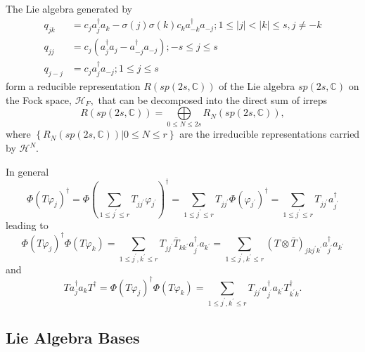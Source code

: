 \documentclass[aps,preprint]{revtex4}%
\begin{document}
The Lie algebra generated by
\begin{align}
q_{jk}  &  =c_{j}a_{j}^{\dagger}a_{k}-\sigma\left(  j\right)  \sigma\left(
k\right)  c_{k}a_{-k}^{\dagger}a_{-j};1\leq\left\vert j\right\vert <\left\vert
k\right\vert \leq s,j\neq-k\\
q_{jj}  &  =c_{j}\left(  a_{j}^{\dagger}a_{j}-a_{-j}^{\dagger}a_{-j}\right)
;-s\leq j\leq s\\
q_{j-j}  &  =c_{j}a_{j}^{\dagger}a_{-j};1\leq j\leq s
\end{align}
form a reducible representation $R\left(  sp\left(  2s,\mathbb{C}\right)
\right)  $ of the Lie algebra $sp\left(  2s,\mathbb{C}\right)  $ on the Fock
space, $\mathcal{H}_{F},$ that can be decomposed into the direct sum of
irreps
\begin{equation}
R\left(  sp\left(  2s,\mathbb{C}\right)  \right)  =\bigoplus\limits_{0\leq
N\leq2s}R_{N}\left(  sp\left(  2s,\mathbb{C}\right)  \right)  ,
\end{equation}
where $\left\{  \left.  R_{N}\left(  sp\left(  2s,\mathbb{C}\right)  \right)
\right\vert 0\leq N\leq r\right\}  $ are the irreducible representations
carried by $\mathcal{H}^{N}.$

In general%
\begin{equation}
\Phi\left(  T\varphi_{j}\right)  ^{\dagger}=\Phi\left(  \sum_{1\leq j^{\prime
}\leq r}T_{jj^{\prime}}\varphi_{j^{\prime}}\right)  ^{\dagger}=\sum_{1\leq
j^{\prime}\leq r}T_{jj^{\prime}}\Phi\left(  \varphi_{j^{\prime}}\right)
^{\dagger}=\sum_{1\leq j^{\prime}\leq r}T_{jj^{\prime}}a_{j^{\prime}}%
^{\dagger}%
\end{equation}
leading to
\begin{equation}
\Phi\left(  T\varphi_{j}\right)  ^{\dagger}\Phi\left(  T\varphi_{k}\right)
=\sum_{1\leq j^{\prime},k^{\prime}\leq r}T_{jj^{\prime}}\bar{T}_{kk^{\prime}%
}a_{j^{\prime}}^{\dagger}a_{k^{\prime}}=\sum_{1\leq j^{\prime},k^{\prime}\leq
r}\left(  T\otimes\bar{T}\right)  _{jkj^{\prime}k^{\prime}}a_{j^{\prime}%
}^{\dagger}a_{k^{\prime}}%
\end{equation}
and%
\begin{equation}
Ta_{j}^{\dagger}a_{k}T^{\dagger}=\Phi\left(  T\varphi_{j}\right)  ^{\dagger
}\Phi\left(  T\varphi_{k}\right)  =\sum_{1\leq j^{\prime},k^{\prime}\leq
r}T_{jj^{\prime}}a_{j^{\prime}}^{\dagger}a_{k^{\prime}}T_{k^{\prime}%
k}^{\dagger}.
\end{equation}


\subsection{Lie Algebra Bases}
\end{document}
